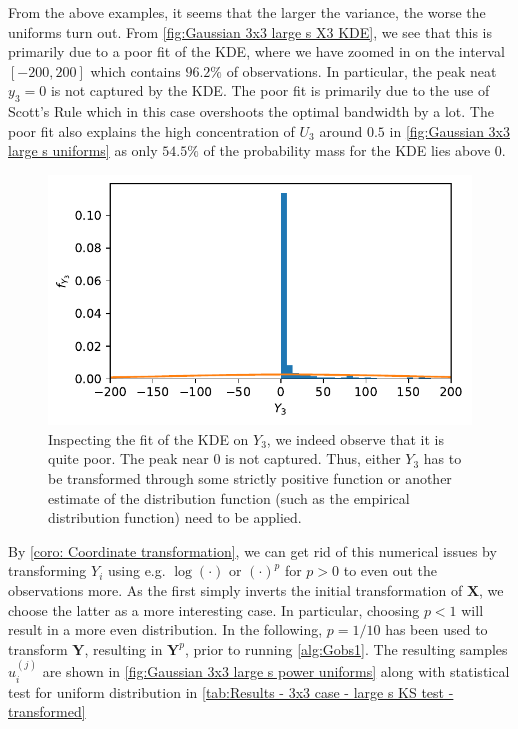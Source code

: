 \documentclass[../Thesis.tex]{subfiles}
\begin{document}
From the above examples, it seems that the larger the variance, the worse the uniforms turn out. From \autoref{fig:Gaussian 3x3 large s X3 KDE}, we see that this is primarily due to a poor fit of the KDE, where we have zoomed in on the interval $[-200 , 200]$ which contains $96.2\%$ of observations. In particular, the peak neat $y_3 = 0$ is not captured by the KDE. The poor fit is primarily due to the use of Scott's Rule which in this case overshoots the optimal bandwidth by a lot. The poor fit also explains the high concentration of $U_3$ around $0.5$ in \autoref{fig:Gaussian 3x3 large s uniforms} as only $54.5\%$ of the probability mass for the KDE lies above $0$.
\begin{figure}[ht]
    \centering
    \includegraphics[width=0.7\linewidth]{figures/ND examples/Gaussian 3x3 large s X3 KDE.pdf}
    \caption{Inspecting the fit of the KDE on $Y_3$, we indeed observe that it is quite poor. The peak near $0$ is not captured. Thus, either $Y_3$ has to be transformed through some strictly positive function or another estimate of the distribution function (such as the empirical distribution function) need to be applied.}
    \label{fig:Gaussian 3x3 large s X3 KDE}
\end{figure}

By \autoref{coro: Coordinate transformation}, we can get rid of this numerical issues by transforming $Y_i$ using e.g. $\log(\cdot)$ or $(\cdot)^{p}$ for $p>0$ to even out the observations more. As the first simply inverts the initial transformation of $\boldsymbol X$, we choose the latter as a more interesting case. In particular, choosing $p<1$ will result in a more even distribution. In the following, $p=1/10$ has been used to transform $\boldsymbol Y$, resulting in $\boldsymbol Y^p$, prior to running \autoref{alg:Gobs1}. The resulting samples $u_i^{(j)}$ are shown in \autoref{fig:Gaussian 3x3 large s power uniforms} along with statistical test for uniform distribution in \autoref{tab:Results - 3x3 case - large s KS test - transformed}
\end{document}
